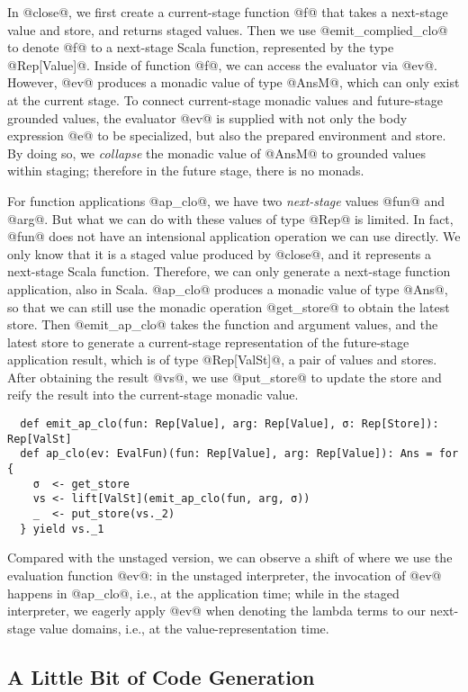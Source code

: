In @close@, we first create a current-stage function @f@ that takes a
next-stage value and store, and returns staged values. Then we use
@emit_complied_clo@ to denote @f@ to a next-stage Scala function, represented
by the type @Rep[Value]@. Inside of function @f@, we can access the evaluator via @ev@.
However, @ev@ produces a monadic value of type @AnsM@, which can only exist at
the current stage. To connect current-stage monadic values and future-stage
grounded values, the evaluator @ev@ is supplied with not only the body
expression @e@ to be specialized, but also the prepared environment and store.
By doing so, we \textit{collapse} the monadic value of @AnsM@ to grounded
values within staging; therefore in the future stage, there is no monads.

For function applications @ap_clo@, we have two \textit{next-stage} values @fun@
and @arg@. But what we can do with these values of type @Rep@ is limited. 
In fact, @fun@ does not have an intensional application operation we can use
directly. We only know that it is a staged value produced by @close@, and
it represents a next-stage Scala function. Therefore, we can only generate a
next-stage function application, also in Scala. @ap_clo@ produces a monadic
value of type @Ans@, so that we can still use the monadic operation @get_store@
to obtain the latest store. Then @emit_ap_clo@ takes the function and argument
values, and the latest store to generate a current-stage representation of the
future-stage application result, which is of type @Rep[ValSt]@, a pair of
values and stores.  After obtaining the result @vs@, we use @put_store@ to
update the store and reify the result into the current-stage monadic value.
\begin{lstlisting}
  def emit_ap_clo(fun: Rep[Value], arg: Rep[Value], σ: Rep[Store]): Rep[ValSt]
  def ap_clo(ev: EvalFun)(fun: Rep[Value], arg: Rep[Value]): Ans = for {
    σ  <- get_store
    vs <- lift[ValSt](emit_ap_clo(fun, arg, σ))
    _  <- put_store(vs._2)
  } yield vs._1
\end{lstlisting}

Compared with the unstaged version, we can observe a shift of where we use the
evaluation function @ev@: in the unstaged interpreter, the invocation of @ev@
happens in @ap_clo@, i.e., at the application time; while in the staged
interpreter, we eagerly apply @ev@ when denoting the lambda terms to our
next-stage value domains, i.e., at the value-representation time.

\subsection{A Little Bit of Code Generation}


